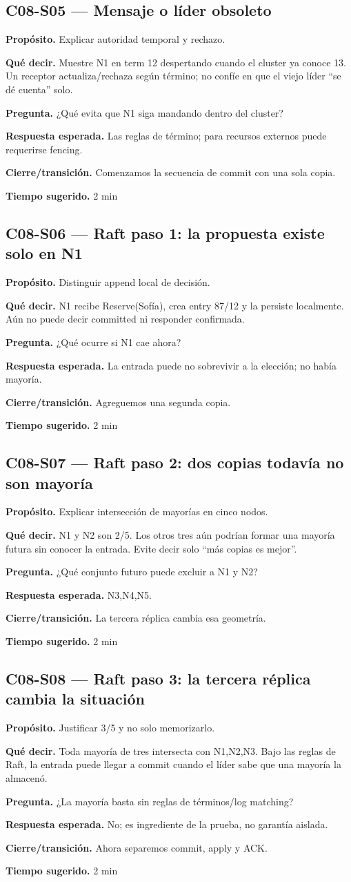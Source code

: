 \documentclass[variant=docente,cover=institutional,mode=screen]{ua-engineering-v6-article}
\newcommand{\FrameField}[2]{\par\noindent\textbf{#1.} #2\par}
\begin{document}
\subsection*{C08-S05 --- Mensaje o líder obsoleto}
\FrameField{Propósito}{Explicar autoridad temporal y rechazo.}
\FrameField{Qué decir}{Muestre N1 en term 12 despertando cuando el cluster ya conoce 13. Un receptor actualiza/rechaza según término; no confíe en que el viejo líder “se dé cuenta” solo.}
\FrameField{Pregunta}{¿Qué evita que N1 siga mandando dentro del cluster?}
\FrameField{Respuesta esperada}{Las reglas de término; para recursos externos puede requerirse fencing.}
\FrameField{Cierre/transición}{Comenzamos la secuencia de commit con una sola copia.}
\FrameField{Tiempo sugerido}{2 min}

\subsection*{C08-S06 --- Raft paso 1: la propuesta existe solo en N1}
\FrameField{Propósito}{Distinguir append local de decisión.}
\FrameField{Qué decir}{N1 recibe Reserve(Sofía), crea entry 87/12 y la persiste localmente. Aún no puede decir committed ni responder confirmada.}
\FrameField{Pregunta}{¿Qué ocurre si N1 cae ahora?}
\FrameField{Respuesta esperada}{La entrada puede no sobrevivir a la elección; no había mayoría.}
\FrameField{Cierre/transición}{Agreguemos una segunda copia.}
\FrameField{Tiempo sugerido}{2 min}

\subsection*{C08-S07 --- Raft paso 2: dos copias todavía no son mayoría}
\FrameField{Propósito}{Explicar intersección de mayorías en cinco nodos.}
\FrameField{Qué decir}{N1 y N2 son 2/5. Los otros tres aún podrían formar una mayoría futura sin conocer la entrada. Evite decir solo “más copias es mejor”.}
\FrameField{Pregunta}{¿Qué conjunto futuro puede excluir a N1 y N2?}
\FrameField{Respuesta esperada}{N3,N4,N5.}
\FrameField{Cierre/transición}{La tercera réplica cambia esa geometría.}
\FrameField{Tiempo sugerido}{2 min}

\subsection*{C08-S08 --- Raft paso 3: la tercera réplica cambia la situación}
\FrameField{Propósito}{Justificar 3/5 y no solo memorizarlo.}
\FrameField{Qué decir}{Toda mayoría de tres intersecta con {N1,N2,N3}. Bajo las reglas de Raft, la entrada puede llegar a commit cuando el líder sabe que una mayoría la almacenó.}
\FrameField{Pregunta}{¿La mayoría basta sin reglas de términos/log matching?}
\FrameField{Respuesta esperada}{No; es ingrediente de la prueba, no garantía aislada.}
\FrameField{Cierre/transición}{Ahora separemos commit, apply y ACK.}
\FrameField{Tiempo sugerido}{2 min}
\end{document}
